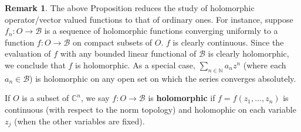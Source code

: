 \documentclass[12pt,a4paper,notitlepage]{article}
\theoremstyle{definition}
\newtheorem{rem}[df]{Remark}
\theoremstyle{plain}
\newcommand{\mc}{\mathcal}
\newcommand{\Cbb}{\mathbb C}
\newcommand{\Nbb}{\mathbb N}
\numberwithin{equation}{section}
\begin{document}
\begin{rem}
The above Proposition reduces the study of holomorphic operator/vector valued functions to that of ordinary ones. For instance, suppose $f_n:O\rightarrow\mc B$ is a sequence of holomorphic functions converging uniformly to a function $f:O\rightarrow\mc B$ on compact subsets of $O$. $f$ is clearly continuous. Since the evaluation of $f$ with any bounded linear functional of $\mc B$ is clearly holomorphic, we conclude that $f$ is holomorphic. As a special case, $\sum_{n\in\Nbb} a_nz^n$ (where each $a_n\in\mc B$) is holomorphic on any open set on which the series converges absolutely. 
\end{rem}






If $O$ is a subset of $\Cbb^n$, we say $f:O\rightarrow\mc B$ is \textbf{holomorphic} if $f=f(z_1,\dots,z_n)$ is continuous (with respect to the norm topology) and holomophic on each variable $z_j$ (when the other variables are fixed).
\end{document}

